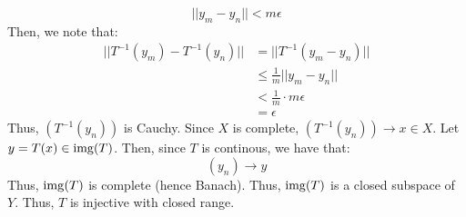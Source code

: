 \documentclass[12pt]{article}
\begin{document}
\begin{solution}
    \[ ||y_m - y_n|| < m \epsilon\]
    Then, we note that: 
    \begin{align*}
        ||T^{-1}(y_m) - T^{-1}(y_n)|| &= ||T^{-1}(y_m - y_n)|| \\
        &\leq \frac{1}{m} ||y_m - y_n|| \\
        &< \frac{1}{m} \cdot m\epsilon \\
        &= \epsilon
    \end{align*}
    Thus, $(T^{-1}(y_n))$ is Cauchy. Since $X$ is complete, $(T^{-1}(y_n)) \to x \in X$. Let $y = T(x) \in \operatorname{img}(T)$. Then, since $T$ is continous, we have that: 
    \[ (y_n) \to y\]
    Thus, $\operatorname{img}(T)$ is complete (hence Banach). Thus, $\operatorname{img}(T)$ is a closed subspace of $Y$. Thus, $T$ is injective with closed range.
\end{solution}
\newpage
\end{document}
